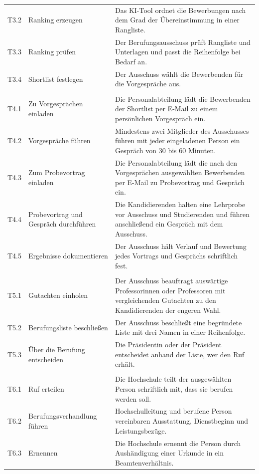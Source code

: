 \begin{small}
\begin{longtable}{@{}>{\raggedright\arraybackslash}p{1.0cm}>{\raggedright\arraybackslash}p{3.6cm}>{\raggedright\arraybackslash}p{10.0cm}@{}}
T3.2 & Ranking erzeugen & Das KI-Tool ordnet die Bewerbungen nach dem Grad der Übereinstimmung in einer Rangliste. \\
T3.3 & Ranking prüfen & Der Berufungsausschuss prüft Rangliste und Unterlagen und passt die Reihenfolge bei Bedarf an. \\
T3.4 & Shortlist festlegen & Der Ausschuss wählt die Bewerbenden für die Vorgespräche aus. \\
\multicolumn{3}{@{}l}{\textbf{TP4 Vorgespräche und Probevorträge}} \\
T4.1 & Zu Vorgesprächen einladen & Die Personalabteilung lädt die Bewerbenden der Shortlist per E-Mail zu einem persönlichen Vorgespräch ein. \\
T4.2 & Vorgespräche führen & Mindestens zwei Mitglieder des Ausschusses führen mit jeder eingeladenen Person ein Gespräch von 30 bis 60 Minuten. \\
T4.3 & Zum Probevortrag einladen & Die Personalabteilung lädt die nach den Vorgesprächen ausgewählten Bewerbenden per E-Mail zu Probevortrag und Gespräch ein. \\
T4.4 & Probevortrag und Gespräch durchführen & Die Kandidierenden halten eine Lehrprobe vor Ausschuss und Studierenden und führen anschließend ein Gespräch mit dem Ausschuss. \\
T4.5 & Ergebnisse dokumentieren & Der Ausschuss hält Verlauf und Bewertung jedes Vortrags und Gesprächs schriftlich fest. \\
\multicolumn{3}{@{}l}{\textbf{TP5 Berufungsvorschlag}} \\
T5.1 & Gutachten einholen & Der Ausschuss beauftragt auswärtige Professorinnen oder Professoren mit vergleichenden Gutachten zu den Kandidierenden der engeren Wahl. \\
T5.2 & Berufungsliste beschließen & Der Ausschuss beschließt eine begründete Liste mit drei Namen in einer Reihenfolge. \\
T5.3 & Über die Berufung entscheiden & Die Präsidentin oder der Präsident entscheidet anhand der Liste, wer den Ruf erhält. \\
\multicolumn{3}{@{}l}{\textbf{TP6 Ruf und Ernennung}} \\
T6.1 & Ruf erteilen & Die Hochschule teilt der ausgewählten Person schriftlich mit, dass sie berufen werden soll. \\
T6.2 & Berufungsverhandlung führen & Hochschulleitung und berufene Person vereinbaren Ausstattung, Dienstbeginn und Leistungsbezüge. \\
T6.3 & Ernennen & Die Hochschule ernennt die Person durch Aushändigung einer Urkunde in ein Beamtenverhältnis. \\

\end{longtable}
\end{small}
